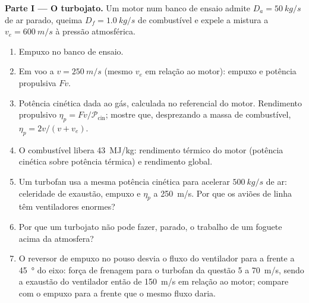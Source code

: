 \begin{problem}
\label{pb:b2:flow-balances:1}

\medskip
\noindent\textbf{Parte I --- O turbojato.}
Um motor num banco de ensaio admite $D_a = \qty{50}{kg/s}$ de ar parado,
queima $D_f = \qty{1.0}{kg/s}$ de combustível e expele a mistura a $v_e =
\qty{600}{m/s}$ à pressão atmosférica.
\begin{enumerate}
  \item Empuxo no banco de ensaio.
  \item Em voo a $v = \qty{250}{m/s}$ (mesmo $v_e$ em relação ao
        motor): empuxo e potência propulsiva $Fv$.
  \item Potência cinética dada ao gás, calculada no referencial do motor.
        Rendimento propulsivo $\eta_p = Fv/\mathcal P_{\text{cin}}$; mostre
        que, desprezando a massa de combustível, $\eta_p = 2v/(v + v_e)$.
  \item O combustível libera \qty{43}{MJ/kg}: rendimento térmico do
        motor (potência cinética sobre potência térmica) e rendimento global.
  \item Um turbofan usa a mesma potência cinética para acelerar
        $\qty{500}{kg/s}$ de ar: celeridade de exaustão, empuxo e $\eta_p$ a
        \qty{250}{m/s}. Por que os aviões de linha têm ventiladores enormes?
  \item Por que um turbojato não pode fazer, parado, o trabalho de um foguete
        acima da atmosfera?
  \item O reversor de empuxo no pouso desvia o fluxo do ventilador para a frente a
        \qty{45}{\degree} do eixo: força de frenagem para o turbofan
        da questão 5 a \qty{70}{m/s}, sendo a exaustão do ventilador então de
        \qty{150}{m/s} em relação ao motor; compare com o empuxo
        para a frente que o mesmo fluxo daria.
\end{enumerate}


\end{problem}
